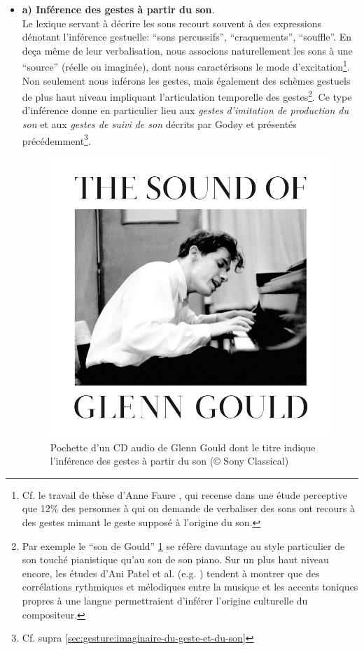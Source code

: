 \vspace{-1em}
\begin{itemize}[noitemsep]
	\item \textbf{a) Inférence des gestes à partir du son}.\\
	Le lexique servant à décrire les sons recourt souvent à des expressions dénotant l'inférence gestuelle: ``sons percussifs'', ``craquements'', ``souffle''. En deça même de leur verbalisation, nous associons naturellement les sons à une ``source'' (réelle ou imaginée), dont nous caractérisons le mode d'excitation\footnote{Cf. le travail de thèse d'Anne Faure \cite{faure_sons_2000}, qui recense dans une étude perceptive que 12\% des personnes à qui on demande de verbaliser des sons ont recours à des gestes mimant le geste supposé à l'origine du son.}. Non seulement nous inférons les gestes, mais également des schèmes gestuels de plus haut niveau impliquant l'articulation temporelle des gestes\footnote{Par exemple le ``son de Gould'' \ref{fig:gesture:Gould} se réfère davantage au style particulier de son touché pianistique qu'au son de son piano. Sur un plus haut niveau encore, les études d'Ani Patel et al. (e.g. \cite{patel_comparing_2006}) tendent à montrer que des corrélations rythmiques et mélodiques entre la musique et les accents toniques propres à une langue permettraient d'inférer l'origine culturelle du compositeur.}. Ce type d'inférence donne en particulier lieu aux \textit{gestes d'imitation de production du son} et aux \textit{gestes de suivi de son} décrits par Godøy et présentés précédemment\footnote{Cf. supra \ref{sec:gesture:imaginaire-du-geste-et-du-son}}.

	\begin{figure}[!htbp]
	\begin{flushright}
		\begin{minipage}[t]{0.93\linewidth}
			\captionsetup{format=plain}%
			\centering
			\includegraphics[width=0.6\linewidth]{gfx/03_gesture/CD-cover-theSoundOfGlennGould2.jpg}
			\caption[``The Sound of  Gleen Gould'', pochette d'un CD audio]{Pochette d'un CD audio de Glenn Gould dont le titre indique l'inférence des gestes à partir du son (© Sony Classical)}
			\label{fig:gesture:Gould}
		\end{minipage}
	\end{flushright}
	\end{figure}


\end{itemize}
